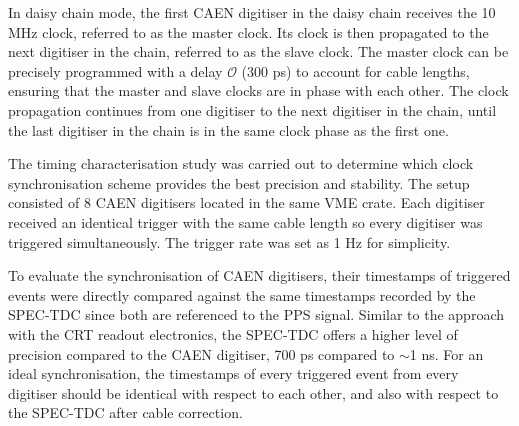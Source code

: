 In daisy chain mode, the first CAEN digitiser in the daisy chain receives the 10 MHz clock, referred to as the master clock.
Its clock is then propagated to the next digitiser in the chain, referred to as the slave clock.
The master clock can be precisely programmed with a delay $\mathcal{O}$ (300 ps) to account for cable lengths, ensuring that the master and slave clocks are in phase with each other.
The clock propagation continues from one digitiser to the next digitiser in the chain, until the last digitiser in the chain is in the same clock phase as the first one.  



The timing characterisation study was carried out to determine which clock synchronisation scheme provides the best precision and stability. 
The setup consisted of 8 CAEN digitisers located in the same VME crate. 
Each digitiser received an identical trigger with the same cable length so every digitiser was triggered simultaneously.
The trigger rate was set as 1 Hz for simplicity.

To evaluate the synchronisation of CAEN digitisers, their timestamps of triggered events were directly compared against the same timestamps recorded by the SPEC-TDC since both are referenced to the 
PPS signal.
Similar to the approach with the CRT readout electronics, the SPEC-TDC offers a higher level of precision compared to the CAEN digitiser, 700 ps compared to $\sim$1 ns. 
For an ideal synchronisation, the timestamps of every triggered event from every digitiser should be identical with respect to each other, and also with respect to the SPEC-TDC after cable correction.



